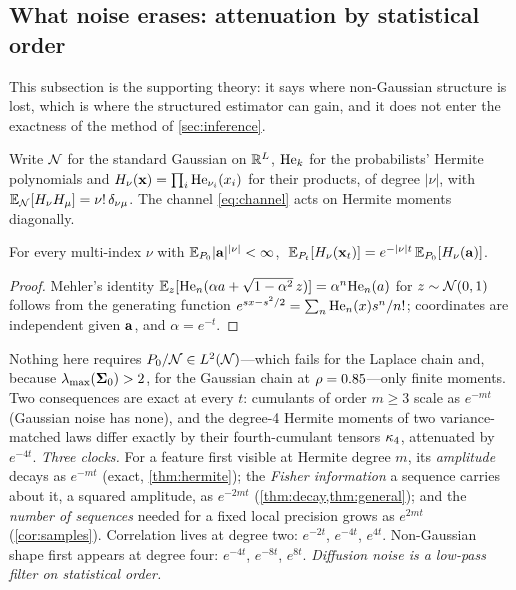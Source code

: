 \subsection{What noise erases: attenuation by statistical order}
\label{sec:theory}

This subsection is the supporting theory: it says where non-Gaussian structure is lost, which is where the
structured estimator can gain, and it does not enter the exactness of the method of \cref{sec:inference}.

Write $\mathcal{N}$ for the standard Gaussian on $\mathbb{R}^{L}$, $\mathrm{He}_{k}$ for the
probabilists' Hermite polynomials and $H_\nu(\mathbf{x})=\prod_i\mathrm{He}_{\nu_i}(x_i)$ for their
products, of degree $|\nu|$, with $\mathbb{E}_{\mathcal{N}}[H_\nu H_\mu]=\nu!\,\delta_{\nu\mu}$. The
channel \cref{eq:channel} acts on Hermite moments diagonally.

\begin{theorem}
\label{thm:hermite}
For every multi-index $\nu$ with $\mathbb{E}_{P_0}|\mathbf{a}|^{|\nu|}<\infty$,
$\;\mathbb{E}_{P_t}[H_\nu(\mathbf{x}_t)]=e^{-|\nu|t}\,\mathbb{E}_{P_0}[H_\nu(\mathbf{a})]$.
\end{theorem}
\begin{proof}
Mehler's identity $\mathbb{E}_{z}[\mathrm{He}_{n}(\alpha a+\sqrt{1-\alpha^2}\,z)]=\alpha^n\mathrm{He}_{n}(a)$ for
$z\sim\mathcal{N}\!\left(0,1\right)$ follows from the generating function
$e^{sx-s^2/2}=\sum_n\mathrm{He}_{n}(x)s^n/n!$; coordinates are independent given $\mathbf{a}$, and
$\alpha=e^{-t}$.
\end{proof}
Nothing here requires $P_0/\mathcal{N}\in L^2(\mathcal{N})$---which fails for the Laplace chain and,
because $\lambda_{\max}(\mathbf{\Sigma}_0)>2$, for the Gaussian chain at $\rho=0.85$---only finite moments.
Two consequences are exact at every $t$: cumulants of order $m\ge3$ scale as $e^{-mt}$
(Gaussian noise has none), and the degree-4 Hermite moments of two variance-matched laws
differ exactly by their fourth-cumulant tensors $\kappa_4$, attenuated by $e^{-4t}$.
\emph{Three clocks.} For a feature first visible at Hermite degree $m$, its
\emph{amplitude} decays as $e^{-mt}$ (exact, \cref{thm:hermite}); the \emph{Fisher
information} a sequence carries about it, a squared amplitude, as $e^{-2mt}$
(\cref{thm:decay,thm:general}); and the \emph{number of sequences} needed for a fixed
local precision grows as $e^{2mt}$ (\cref{cor:samples}). Correlation lives at degree two:
$e^{-2t}$, $e^{-4t}$, $e^{4t}$. Non-Gaussian shape first appears at degree four:
$e^{-4t}$, $e^{-8t}$, $e^{8t}$. \emph{Diffusion noise is a low-pass filter on
statistical order.}

